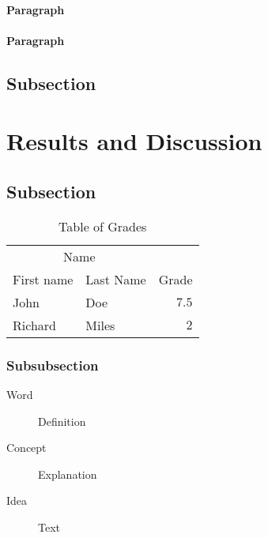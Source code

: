 \documentclass[fleqn,10pt]{SelfArx} %
\begin{document}
	\lipsum[6] %
	
	\paragraph{Paragraph} \lipsum[7] %
	\paragraph{Paragraph} \lipsum[8] %
	
	\subsection{Subsection}
	
	\lipsum[9] %
		
	
	\section{Results and Discussion}
	
	\lipsum[10] %
	
	\subsection{Subsection}
	
	\lipsum[11] %
	
	\begin{table}[hbt]
		\caption{Table of Grades}
		\centering
		\begin{tabular}{llr}
			\toprule
			\multicolumn{2}{c}{Name} \\
			\cmidrule(r){1-2}
			First name & Last Name & Grade \\
			\midrule
			John & Doe & $7.5$ \\
			Richard & Miles & $2$ \\
			\bottomrule
		\end{tabular}
		\label{tab:label}
	\end{table}
	
	\subsubsection{Subsubsection}
	
	\lipsum[12] %
	
	\begin{description}
		\item[Word] Definition
		\item[Concept] Explanation
		\item[Idea] Text
	\end{description}
	
\end{document}
